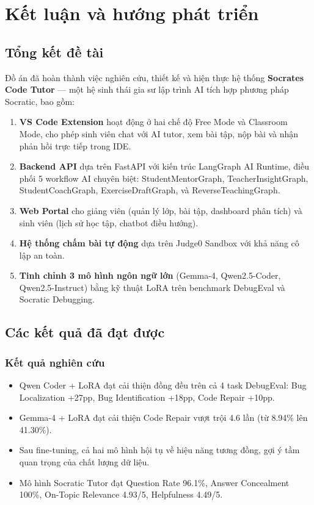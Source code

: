 \chapter{Kết luận và hướng phát triển}
\label{chap:conclusion}

\section{Tổng kết đề tài}

Đồ án đã hoàn thành việc nghiên cứu, thiết kế và hiện thực hệ thống \textbf{Socrates Code Tutor} --- một hệ sinh thái gia sư lập trình AI tích hợp phương pháp Socratic, bao gồm:

\begin{enumerate}
    \item \textbf{VS Code Extension} hoạt động ở hai chế độ Free Mode và Classroom Mode, cho phép sinh viên chat với AI tutor, xem bài tập, nộp bài và nhận phản hồi trực tiếp trong IDE.
    \item \textbf{Backend API} dựa trên FastAPI với kiến trúc LangGraph AI Runtime, điều phối 5 workflow AI chuyên biệt: StudentMentorGraph, TeacherInsightGraph, StudentCoachGraph, ExerciseDraftGraph, và ReverseTeachingGraph.
    \item \textbf{Web Portal} cho giảng viên (quản lý lớp, bài tập, dashboard phân tích) và sinh viên (lịch sử học tập, chatbot điều hướng).
    \item \textbf{Hệ thống chấm bài tự động} dựa trên Judge0 Sandbox với khả năng cô lập an toàn.
    \item \textbf{Tinh chỉnh 3 mô hình ngôn ngữ lớn} (Gemma-4, Qwen2.5-Coder, Qwen2.5-Instruct) bằng kỹ thuật LoRA trên benchmark DebugEval và Socratic Debugging.
\end{enumerate}

\section{Các kết quả đã đạt được}

\subsection{Kết quả nghiên cứu}

\begin{itemize}
    \item Qwen Coder + LoRA đạt cải thiện đồng đều trên cả 4 task DebugEval: Bug Localization +27pp, Bug Identification +18pp, Code Repair +10pp.
    \item Gemma-4 + LoRA đạt cải thiện Code Repair vượt trội 4.6 lần (từ 8.94\% lên 41.30\%).
    \item Sau fine-tuning, cả hai mô hình hội tụ về hiệu năng tương đồng, gợi ý tầm quan trọng của chất lượng dữ liệu.
    \item Mô hình Socratic Tutor đạt Question Rate 96.1\%, Answer Concealment 100\%, On-Topic Relevance 4.93/5, Helpfulness 4.49/5.
\end{itemize}

